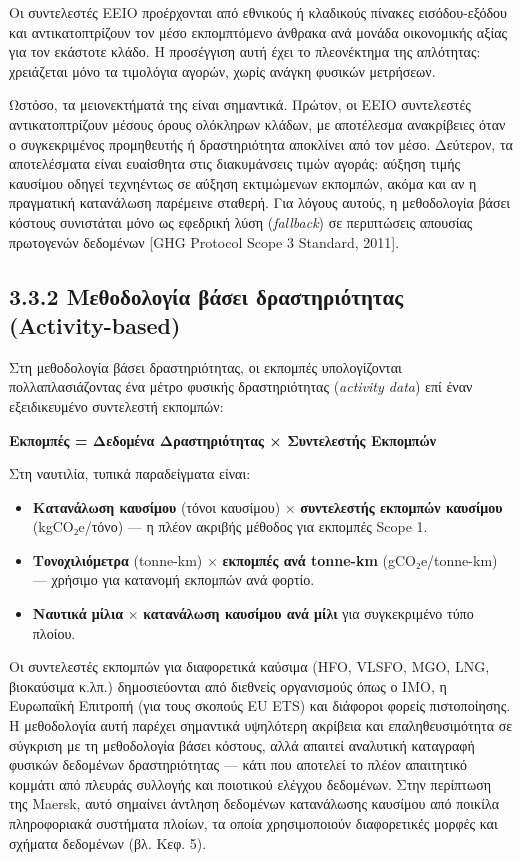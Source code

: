 \documentclass[11pt,a4paper,greek,twoside]{template-xe}
\providecommand{\tightlist}{\setlength{\itemsep}{0pt}\setlength{\parskip}{0pt}}
\begin{document}
Οι συντελεστές EEIO προέρχονται από εθνικούς ή κλαδικούς πίνακες
εισόδου-εξόδου και αντικατοπτρίζουν τον μέσο εκπομπτόμενο άνθρακα ανά
μονάδα οικονομικής αξίας για τον εκάστοτε κλάδο. Η προσέγγιση αυτή έχει
το πλεονέκτημα της απλότητας: χρειάζεται μόνο τα τιμολόγια αγορών, χωρίς
ανάγκη φυσικών μετρήσεων.

Ωστόσο, τα μειονεκτήματά της είναι σημαντικά. Πρώτον, οι EEIO
συντελεστές αντικατοπτρίζουν μέσους όρους ολόκληρων κλάδων, με
αποτέλεσμα ανακρίβειες όταν ο συγκεκριμένος προμηθευτής ή δραστηριότητα
αποκλίνει από τον μέσο. Δεύτερον, τα αποτελέσματα είναι ευαίσθητα στις
διακυμάνσεις τιμών αγοράς: αύξηση τιμής καυσίμου οδηγεί τεχνηέντως σε
αύξηση εκτιμώμενων εκπομπών, ακόμα και αν η πραγματική κατανάλωση
παρέμεινε σταθερή. Για λόγους αυτούς, η μεθοδολογία βάσει κόστους
συνιστάται μόνο ως εφεδρική λύση (\emph{fallback}) σε περιπτώσεις
απουσίας πρωτογενών δεδομένων {[}GHG Protocol Scope 3 Standard, 2011{]}.

\subsection{3.3.2 Μεθοδολογία βάσει δραστηριότητας
(Activity-based)}\label{ux3bcux3b5ux3b8ux3bfux3b4ux3bfux3bbux3bfux3b3ux3afux3b1-ux3b2ux3acux3c3ux3b5ux3b9-ux3b4ux3c1ux3b1ux3c3ux3c4ux3b7ux3c1ux3b9ux3ccux3c4ux3b7ux3c4ux3b1ux3c2-activity-based}

Στη μεθοδολογία βάσει δραστηριότητας, οι εκπομπές υπολογίζονται
πολλαπλασιάζοντας ένα μέτρο φυσικής δραστηριότητας (\emph{activity
data}) επί έναν εξειδικευμένο συντελεστή εκπομπών:

\textbf{Εκπομπές = Δεδομένα Δραστηριότητας × Συντελεστής Εκπομπών}

Στη ναυτιλία, τυπικά παραδείγματα είναι:

\begin{itemize}
\tightlist
\item
  \textbf{Κατανάλωση καυσίμου} (τόνοι καυσίμου) × \textbf{συντελεστής
  εκπομπών καυσίμου} (kgCO₂e/τόνο) --- η πλέον ακριβής μέθοδος για
  εκπομπές Scope 1.
\item
  \textbf{Τονοχιλιόμετρα} (tonne-km) × \textbf{εκπομπές ανά tonne-km}
  (gCO₂e/tonne-km) --- χρήσιμο για κατανομή εκπομπών ανά φορτίο.
\item
  \textbf{Ναυτικά μίλια} × \textbf{κατανάλωση καυσίμου ανά μίλι} για
  συγκεκριμένο τύπο πλοίου.
\end{itemize}

Οι συντελεστές εκπομπών για διαφορετικά καύσιμα (HFO, VLSFO, MGO, LNG,
βιοκαύσιμα κ.λπ.) δημοσιεύονται από διεθνείς οργανισμούς όπως ο IMO, η
Ευρωπαϊκή Επιτροπή (για τους σκοπούς EU ETS) και διάφοροι φορείς
πιστοποίησης. Η μεθοδολογία αυτή παρέχει σημαντικά υψηλότερη ακρίβεια
και επαληθευσιμότητα σε σύγκριση με τη μεθοδολογία βάσει κόστους, αλλά
απαιτεί αναλυτική καταγραφή φυσικών δεδομένων δραστηριότητας --- κάτι
που αποτελεί το πλέον απαιτητικό κομμάτι από πλευράς συλλογής και
ποιοτικού ελέγχου δεδομένων. Στην περίπτωση της Maersk, αυτό σημαίνει
άντληση δεδομένων κατανάλωσης καυσίμου από ποικίλα πληροφοριακά
συστήματα πλοίων, τα οποία χρησιμοποιούν διαφορετικές μορφές και σχήματα
δεδομένων (βλ. Κεφ. 5).
\end{document}
